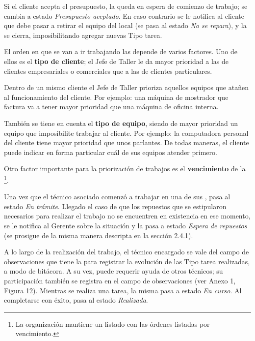 \documentclass[12pt]{extarticle}
\begin{document}
\begin{spacing}{1.2}
    Si el cliente acepta el presupuesto, la \OT{} queda en espera de comienzo de trabajo; se cambia a estado \textit{Presupuesto aceptado}. En caso contrario se le notifica al cliente que debe pasar a retirar el equipo del local (se pasa al estado \textit{No se repara}), y la \OT{} se cierra, imposibilitando agregar nuevas Tipo tarea.

    El orden en que se van a ir trabajando las \OTs{} depende de varios factores. Uno de ellos es el \textbf{tipo de cliente}; el Jefe de Taller le da mayor prioridad a las \OTs{} de clientes empresariales o comerciales que a las de clientes particulares.

    Dentro de un mismo cliente el Jefe de Taller prioriza aquellos equipos que atañen al funcionamiento del cliente. Por ejemplo: una máquina de mostrador que factura va a tener mayor prioridad que una máquina de oficina interna.

    También se tiene en cuenta el \textbf{tipo de equipo}, siendo de mayor prioridad un equipo que imposibilite trabajar al cliente. Por ejemplo: la computadora personal del cliente tiene mayor prioridad que unos parlantes.
    De todas maneras, el cliente puede indicar en forma particular cuál de sus equipos atender primero.

    Otro factor importante para la priorización de trabajos es el \textbf{vencimiento} de la \OT{}\footnote{La organización mantiene un listado con las órdenes listadas por vencimiento.}. 
    
    Una vez que el técnico asociado comenzó a trabajar en una de sus \OT{}, pasa al estado \textit{En trámite}. Llegado el caso de que los repuestos que se estipularon necesarios para realizar el trabajo no se encuentren en existencia en ese momento, se le notifica al Gerente sobre la situación y la \OT{} pasa a estado \textit{Espera de repuestos} (se prosigue de la misma manera descripta en la sección 2.4.1).

    A lo largo de la realización del trabajo, el técnico encargado se vale del campo de observaciones que tiene la \OT{} para registrar la evolución de las Tipo tarea realizadas, a modo de bitácora. A su vez, puede requerir ayuda de otros técnicos; su participación también se registra en el campo de observaciones (ver Anexo 1, Figura 12). Mientras se realiza una tarea, la misma pasa a estado \textit{En curso}. Al completarse con éxito, pasa al estado \textit{Realizada}.
    

\end{spacing}
\end{document}
